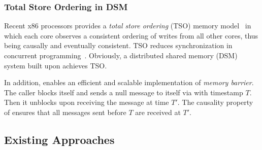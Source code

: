 \subsubsection{Total Store Ordering in DSM}

Recent x86 processors provides a \textit{total store ordering} (TSO) memory model~\cite{sewell2010x86} in which each core observes a consistent ordering of writes from all other cores, thus being causally and eventually consistent.
TSO reduces synchronization in concurrent programming~\cite{morrison2013fast,tassarotti2015verifying}.
Obviously, a distributed shared memory (DSM) system built upon \sys achieves TSO.

In addition, \sys enables an efficient and scalable implementation of \textit{memory barrier}.
The caller blocks itself and sends a null message to itself via \sys with timestamp $T$. Then it unblocks upon receiving the message at time $T'$.
The causality property of \sys ensures that all messages sent before $T$ are received at $T'$.

\subsection{Existing Approaches}
\label{subsec:existing-approaches}

